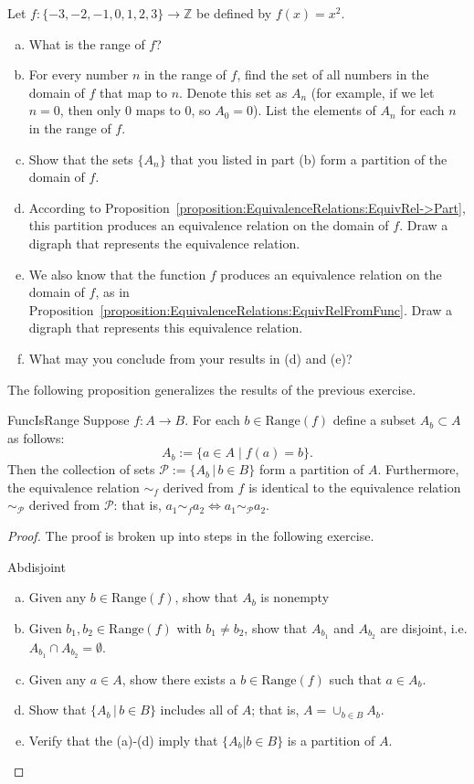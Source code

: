 \begin{exercise}{66}
Let $f\colon \{-3,-2,-1,0,1,2,3\} \to \mathbb{Z}$ be defined by $f(x) =  x^2$.
\begin{enumerate}[(a)]
\item
What is the range of $f$?
\item
For every number $n$ in the range of $f$, find the set of all numbers in the domain of $f$ that map to $n$. Denote this set as $A_n$ (for example, if we let $n=0$, then only 0 maps to 0, so $A_0 = 0$). List the elements of $A_n$ for each $n$ in the range of $f$. 
\item 
Show that the sets $\{ A_n \}$ that you listed in part (b) form a partition of the domain of $f$.
\item
According to Proposition~\ref{proposition:EquivalenceRelations:EquivRel->Part}, this partition produces an equivalence relation  on  the domain of $f$.  Draw a digraph that represents the equivalence relation.
\item
We also know that the function $f$ produces an equivalence relation on the domain of $f$, as in Proposition~\ref{proposition:EquivalenceRelations:EquivRelFromFunc}.  Draw a digraph that represents this equivalence relation.
\item
What may you conclude from your results in (d) and (e)?   
\end{enumerate}
\end{exercise}

The following proposition generalizes the results of the previous exercise.

\begin{prop}{FuncIsRange}
Suppose $f:A \rightarrow B$. For each $b \in \text{Range}(f)$ define a subset $A_b \subset A$ as follows:
$$A_b:=\{a \in A \mid f(a)=b \}.$$
Then the collection of sets $ \mathcal{P} :=\{A_b \, |\,  b \in B\}$ form a partition of $A$. Furthermore, the equivalence relation $\sim_f$ derived from $f$ is identical to the equivalence relation $\sim_{\mathcal{P}}$ derived from $\mathcal{P}$: that is, $a_1 \sim_f a_2 \iff a_1 \sim_{\mathcal{P}} a_2$.
\end{prop}
\begin{proof}  The proof is broken up into steps in the following exercise.

\begin{exercise}{Abdisjoint}
\begin{enumerate}[(a)]
\item Given any $b \in \text{Range}(f)$, show that $A_b$ is nonempty
\item Given $b_1, b_2\in \text{Range}(f)$ with $b_1 \neq b_2$, show that $A_{b_1}$ and $A_{b_2}$ are disjoint, i.e. $A_{b_1} \cap A_{b_2}=\emptyset$.  
\item Given any $a \in A$, show there exists a $b \in \text{Range}(f)$ such that $a \in A_b$. 
\item Show that $\{A_b \, | \, b \in B\}$ includes all of $A$; that is, $A=\cup_{b \in B} A_b$.
\item Verify that the (a)-(d) imply that $\{A_b | b \in B\}$ is a partition of $A$.
\end{enumerate}
\end{exercise}
\end{proof}

